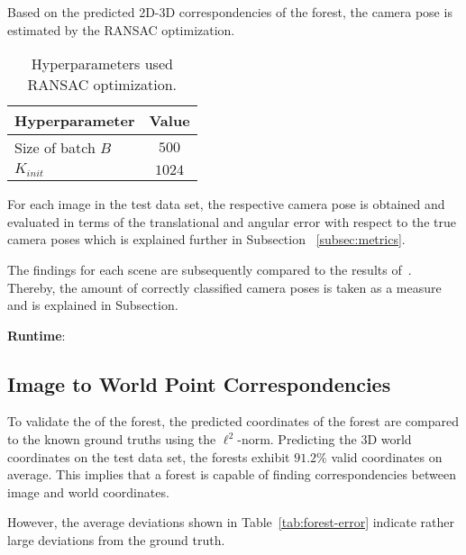 \documentclass[final]{cvpr}
\begin{document}
Based on the predicted 2D-3D correspondencies of the forest, the camera pose is estimated by the RANSAC optimization.
\begin{table}[h!]
	\begin{center}
	\begin{tabular}{|l|c|}
	\hline
	Hyperparameter & Value \\
	\hline\hline
	Size of batch $B$ & $500$ \\
	$K_{init}$ & $1024$ \\
	
	\hline
	\end{tabular}
	\end{center}
	\label{tab:params-ransac}
	\caption{Hyperparameters used RANSAC optimization.}
\end{table}


For each image in the test data set, the respective camera pose is obtained and evaluated in terms of the translational 
and angular error with respect to the true camera poses which is explained further in Subsection ~\ref{subsec:metrics}.
 

The findings for each scene are subsequently compared
to the results of~\cite{shotton2013}. Thereby, the amount of correctly classified camera poses is taken as a measure 
and is explained in Subsection.

\textbf{Runtime}: 



\subsection{Image to World Point Correspondencies}
To validate the  of the forest, the predicted coordinates of the forest are compared to the known ground truths using 
the $\ell^2$-norm. Predicting the 3D world coordinates on the test data set, the forests exhibit
$91.2\%$ valid coordinates on average. This implies that a forest is capable of finding correspondencies between 
image and world coordinates. 

However, the average deviations shown in Table~\ref{tab:forest-error} indicate rather 
large deviations from the ground truth. %
\end{document}

